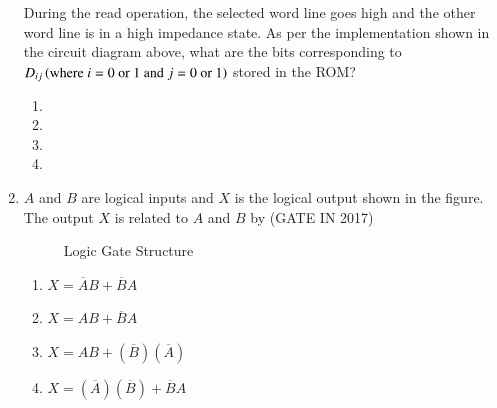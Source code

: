 \begin{enumerate}
		During the read operation, the selected word line goes high and the other word line is in a high impedance state. As per the implementation shown in the circuit diagram above, what are the bits corresponding to $D_{ij}\left(\text{where $i=0$ or $1$ and $j=0$ or $1$}\right)$ stored in the ROM?
\begin{enumerate}
    \item {}
    \item {}
    \item {}    
    \item {}
\end{enumerate}
    \item $A$ and $B$ are logical inputs and $X$ is the logical output shown in the figure. The output $X$ is related to $A$ and $B$ by
\hfill{(GATE IN 2017)}
\begin{figure}[!ht]
\centering

\label{fig:gate_in_2017_logic_gates}
\caption{Logic Gate Structure}
\end{figure}
\begin{enumerate}[label=\Alph*.]
\item $X = \overline{A}B + \overline{B}A$
\item $X = AB + \overline{B}A$
\item $X = AB + (\overline{B})(\overline{A})$
\item $X = (\overline{A})(\overline{B}) + \overline{B}A$
\end{enumerate}
\end{enumerate}

